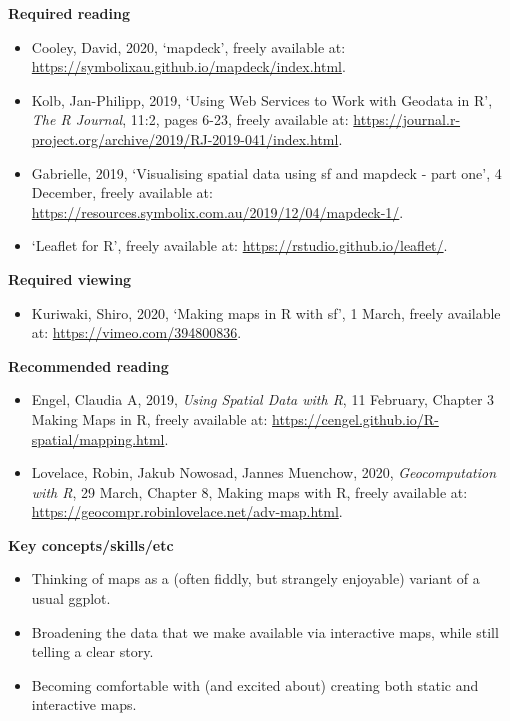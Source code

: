\documentclass[
]{book}
\providecommand{\tightlist}{%
  \setlength{\itemsep}{0pt}\setlength{\parskip}{0pt}}
\begin{document}
\textbf{Required reading}

\begin{itemize}
\tightlist
\item
  Cooley, David, 2020, `mapdeck', freely available at: \url{https://symbolixau.github.io/mapdeck/index.html}.
\item
  Kolb, Jan-Philipp, 2019, `Using Web Services to Work with Geodata in R', \emph{The R Journal}, 11:2, pages 6-23, freely available at: \url{https://journal.r-project.org/archive/2019/RJ-2019-041/index.html}.
\item
  Gabrielle, 2019, `Visualising spatial data using sf and mapdeck - part one', 4 December, freely available at: \url{https://resources.symbolix.com.au/2019/12/04/mapdeck-1/}.
\item
  `Leaflet for R', freely available at: \url{https://rstudio.github.io/leaflet/}.
\end{itemize}

\textbf{Required viewing}

\begin{itemize}
\tightlist
\item
  Kuriwaki, Shiro, 2020, `Making maps in R with sf', 1 March, freely available at: \url{https://vimeo.com/394800836}.
\end{itemize}

\textbf{Recommended reading}

\begin{itemize}
\tightlist
\item
  Engel, Claudia A, 2019, \emph{Using Spatial Data with R}, 11 February, Chapter 3 Making Maps in R, freely available at: \url{https://cengel.github.io/R-spatial/mapping.html}.
\item
  Lovelace, Robin, Jakub Nowosad, Jannes Muenchow, 2020, \emph{Geocomputation with R}, 29 March, Chapter 8, Making maps with R, freely available at: \url{https://geocompr.robinlovelace.net/adv-map.html}.
\end{itemize}

\textbf{Key concepts/skills/etc}

\begin{itemize}
\tightlist
\item
  Thinking of maps as a (often fiddly, but strangely enjoyable) variant of a usual ggplot.
\item
  Broadening the data that we make available via interactive maps, while still telling a clear story.
\item
  Becoming comfortable with (and excited about) creating both static and interactive maps.
\end{itemize}
\end{document}
